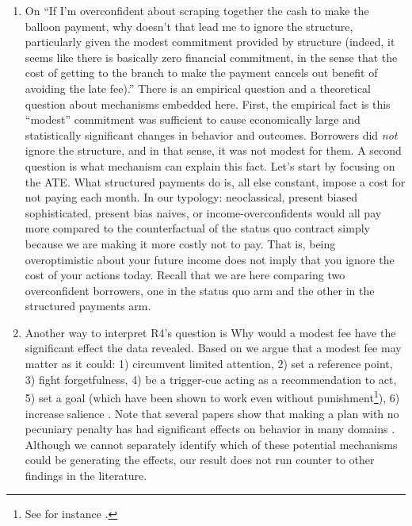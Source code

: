 \documentclass[11pt, colorinlistoftodos]{article} %
\newcounter{point}
\begin{document}
\begin{enumerate}
    \item On  ``If I’m overconfident about scraping together the cash to make the balloon payment, why doesn’t that lead me to ignore the structure, particularly given the modest commitment provided by structure (indeed, it seems like there is basically zero financial commitment, in the sense that the cost of getting to the branch to make the payment cancels out benefit of avoiding the late fee).''  There is an empirical question and a theoretical question about mechanisms embedded here. First, the empirical fact is this ``modest'' commitment was sufficient to cause economically large and statistically significant changes in behavior and outcomes. Borrowers did \textit{not} ignore the structure, and in that sense, it was not modest for them. A second question is what mechanism can explain this fact. Let's start by focusing on the ATE. What structured payments do is, all else constant, impose a cost for not paying each month. In our typology: neoclassical, present biased sophisticated, present bias naives, or income-overconfidents would all pay more compared to the counterfactual of the status quo contract simply because we are making it more costly not to pay. That is, being overoptimistic about your future income does not imply that you ignore the cost of your actions today. Recall that we are here comparing two overconfident borrowers, one in the status quo arm and the other in the structured payments arm.
    \item Another way to interpret R4's question is Why would a modest fee have the significant effect the data revealed. Based on \cite{beshears2016beyond} we argue that a modest fee may matter as it could: 1) circumvent limited attention, 2) set a reference point, 3) fight forgetfulness, 4) be a trigger-cue acting as a recommendation to act, 5) set a goal (which have been shown to work even without punishment\footnote{See for instance \cite{locke1990theory, heath1999goals}.}), 6) increase salience \citep{bordalo2013salience}. Note that several papers show that making a plan with no pecuniary penalty has had significant effects on behavior in many domains \citep{nickerson2010voting,milkman2011using,milkman2013planning}. Although we cannot separately identify which of these potential mechanisms could be generating the effects, our result does not run counter to other findings in the literature. 

\end{enumerate}
\end{document}
